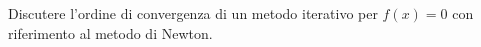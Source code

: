 Discutere l'ordine di convergenza di un metodo iterativo per 
$f(x)=0$ con riferimento al metodo di Newton.
